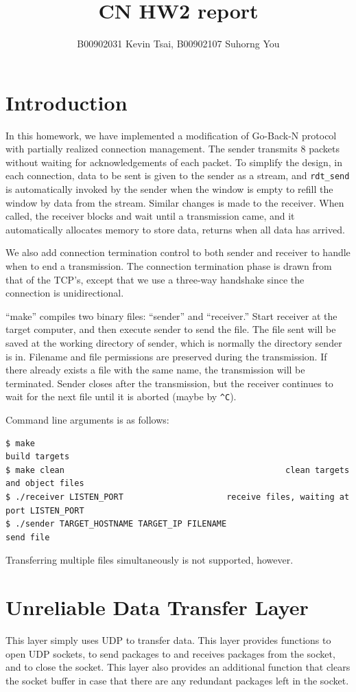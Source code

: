 \documentclass[10pt,a4paper]{article}
\author{B00902031 Kevin Tsai, B00902107 Suhorng You}
\title{CN HW2 report}
\begin{document}
\maketitle

\section{Introduction}
    In this homework, we have implemented a modification of Go-Back-N protocol with partially realized connection management. The sender transmits $8$ packets without waiting for acknowledgements of each packet. To simplify the design, in each connection, data to be sent is given to the sender as a stream, and \texttt{rdt\_send} is automatically invoked by the sender when the window is empty to refill the window by data from the stream. Similar changes is made to the receiver. When called, the receiver blocks and wait until a transmission came, and it automatically allocates memory to store data, returns when all data has arrived.

    We also add connection termination control to both sender and receiver to handle when to end a transmission. The connection termination phase is drawn from that of the TCP's, except that we use a three-way handshake since the connection is unidirectional.

    ``make'' compiles two binary files: ``sender'' and ``receiver.'' Start receiver at the target computer, and then execute sender to send the file. The file sent will be saved at the working directory of sender, which is normally the directory sender is in. Filename and file permissions are preserved during the transmission. If there already exists a file with the same name, the transmission will be terminated. Sender closes after the transmission, but the receiver continues to wait for the next file until it is aborted (maybe by \texttt{\^{}C}).

    Command line arguments is as follows:
\begin{verbatim}
$ make                                                                    build targets
$ make clean                                             clean targets and object files
$ ./receiver LISTEN_PORT                     receive files, waiting at port LISTEN_PORT
$ ./sender TARGET_HOSTNAME TARGET_IP FILENAME                                 send file
\end{verbatim}

    Transferring multiple files simultaneously is not supported, however.
\section{Unreliable Data Transfer Layer}
    This layer simply uses UDP to transfer data. This layer provides functions to open UDP sockets, to send packages to and receives packages from the socket, and to close the socket. This layer also provides an additional function that clears the socket buffer in case that there are any redundant packages left in the socket.
\end{document}
